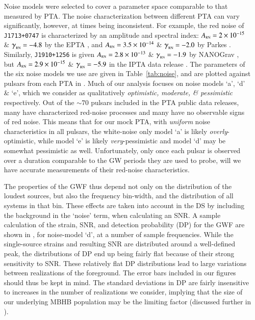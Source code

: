 \documentclass[useAMS, usenatbib]{mnras}  %
\newcommand{\rnamp}{A_\trt{RN}}
\newcommand{\rnind}{{\protect\scalebox{1.1}{\ensuremath{\gamma{}}}_\trt{RN}}}
\begin{document}
        Noise models were selected to cover a parameter space comparable to that measured by PTA.  The noise characterization between different PTA can vary significantly, however, at times being inconsistent.  For example, the red noise of \texttt{J1713+0747} is characterized by an amplitude and spectral index: $\rnamp = 2\E{-15}$ \& $\rnind = -4.8$ by the EPTA \citep{caballero2016}, and $\rnamp = 3.5\E{-14}$ \& $\rnind = -2.0$ by Parkes \citep{reardon2016}.  Similarly, \texttt{J1910+1256} is given $\rnamp = 2.8\E{-13}$ \& $\rnind = -1.9$ by NANOGrav \citep{arzoumanian2015a}, but $\rnamp = 2.9\E{-15}$ \& $\rnind = -5.9$ in the IPTA data release \citep{Verbiest201602}.  The parameters of the six noise models we use are given in Table~\ref{tab:noise}, and are plotted against pulsars from each PTA in .  Much of our analysis focuses on noise models `a', `d' \& `e', which we consider as qualitatively \textit{optimistic, moderate, \& pessimistic} respectively.  Out of the $\sim 70$ pulsars included in the PTA public data releases, many have characterized red-noise processes and many have no observable signs of red noise.  This means that for our mock PTA, with \textit{uniform} noise characteristics in all pulsars, the white-noise only model `a' is likely \textit{overly}-optimistic, while model `e' is likely \textit{very}-pessimistic and model `d' may be somewhat pessimistic as well.  Unfortunately, only once each pulsar is observed over a duration comparable to the GW periods they are used to probe, will we have accurate measurements of their red-noise characteristics.

        The properties of the GWF thus depend not only on the distribution of the loudest sources, but also the frequency bin-width, and the distribution of all systems in that bin.  These effects are taken into account in the DS by including the background in the `noise' term, when calculating an SNR. A sample calculation of the strain, SNR, and detection probability (DP) for the GWF are shown in , for noise-model `d', at a number of sample frequencies.  While the single-source strains and resulting SNR are distributed around a well-defined peak, the distributions of DP end up being fairly flat because of their strong sensitivity to SNR.  These relatively flat DP distributions lead to large variations between realizations of the foreground.  The error bars included in our figures should thus be kept in mind.  The standard deviations in DP are fairly insensitive to increases in the number of realizations we consider, implying that the size of our underlying MBHB population may be the limiting factor (discussed further in ).
\end{document}
